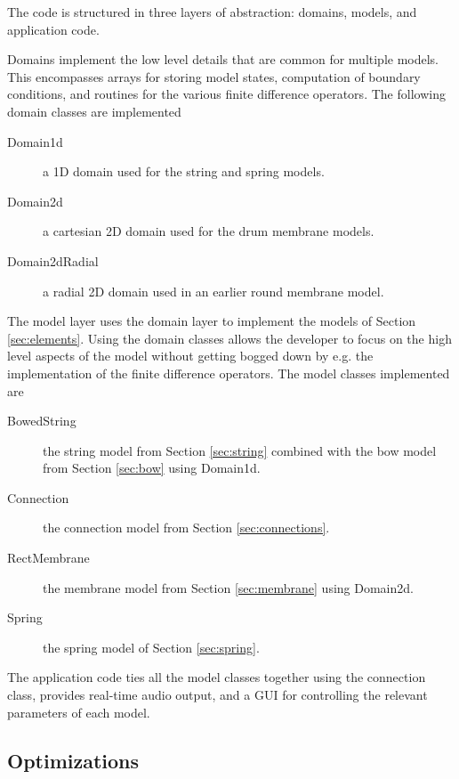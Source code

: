 \documentclass{article}
\begin{document}
The code is structured in three layers of abstraction: domains, models, and application code.

Domains implement the low level details that are common for multiple models.
This encompasses arrays for storing model states, computation of boundary conditions, and routines for the various finite difference operators.
The following domain classes are implemented
\begin{description}
  \item[Domain1d] a 1D domain used for the string and spring models.
  \item[Domain2d] a cartesian 2D domain used for the drum membrane models. 
  \item[Domain2dRadial] a radial 2D domain used in an earlier round membrane model.
\end{description}
%
The model layer uses the domain layer to implement the models of Section \ref{sec:elements}.
Using the domain classes allows the developer to focus on the high level aspects of the model without getting bogged down by e.g. the implementation of the finite difference operators.
The model classes implemented are
\begin{description}
  \item[BowedString] the string model from Section \ref{sec:string} combined with the bow model from Section \ref{sec:bow} using Domain1d.
  \item[Connection] the connection model from Section \ref{sec:connections}.
  \item[RectMembrane] the membrane model from Section \ref{sec:membrane} using Domain2d.
  \item[Spring] the spring model of Section \ref{sec:spring}.
\end{description}
%
The application code ties all the model classes together using the connection class, provides real-time audio output, and a GUI for controlling the relevant parameters of each model.

\subsection{Optimizations}
\label{sec:optimizations}
\end{document}
